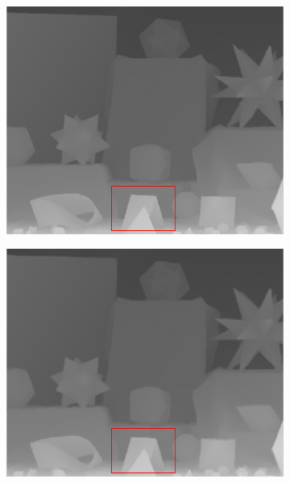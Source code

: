 \documentclass[preprint,10pt,5p,times,twocolumn]{elsarticle}
\begin{document}
\begin{figure}[t]
\begin{center}
\begin{subfigure}[b]{0.136\linewidth}
    \includegraphics[width=\linewidth]{cmp_moebius_8X_ST.png}
    \label{fig:}
\end{subfigure}
\begin{subfigure}[b]{0.136\linewidth}
    \includegraphics[width=\linewidth]{cmp_moebius_8X_LF.png}
    \label{fig:} %
\end{subfigure}
\begin{subfigure}[b]{0.136\linewidth}

\end{subfigure}
\end{center}
\end{figure}
\end{document}
